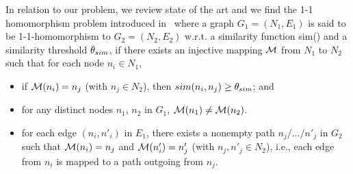 In relation to our problem, we review state of the art and we find the 1-1 homomorphism problem introduced in~\cite{Fan:2010:GHR} where a graph $G_1=(N_1,E_1)$ is said to be 1-1-homomorphism to $G_2=(N_2,E_2)$ w.r.t. a similarity function sim() and a similarity threshold $\theta_{sim}$, 
if there exists an injective mapping ${\mathcal M}$ from $N_1$ to $N_2$ such that for each node $n_i \in N_1$,
\begin{itemize}
\item if ${\mathcal M}(n_i) = n_j$ (with $n_j \in N_2$), then $sim(n_i, n_j) \geq \theta_{sim}$; and
\item for any distinct nodes $n_1$, $n_2$ in $G_1$, ${\mathcal M}(n_1)\neq {\mathcal M}(n_2)$. 
\item for each edge $(n_i,n'_i)$ in $E_1$, there exists a nonempty path $n_j/.../n'_j$ in $G_2$ such that ${\mathcal M}(n_i) = n_j$ and ${\mathcal M}(n'_i) = n'_j$ (with $n_j,n'_j \in N_2$), i.e., each edge from $n_i$ is mapped to a path outgoing from $n_j$.
\end{itemize}


